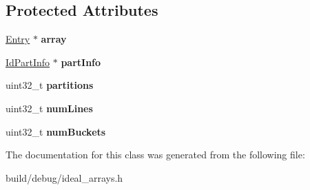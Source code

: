 \subsection*{Protected Attributes}
\begin{DoxyCompactItemize}
\item 
\hypertarget{classIdealLRUPartReplPolicy_abe479cb1f36a5b7028cc287696915b1f}{\hyperlink{structIdealLRUPartReplPolicy_1_1Entry}{Entry} $\ast$ {\bfseries array}}\label{classIdealLRUPartReplPolicy_abe479cb1f36a5b7028cc287696915b1f}

\item 
\hypertarget{classIdealLRUPartReplPolicy_a3903c466038d4348bc69637724e2bb18}{\hyperlink{structIdealLRUPartReplPolicy_1_1IdPartInfo}{Id\-Part\-Info} $\ast$ {\bfseries part\-Info}}\label{classIdealLRUPartReplPolicy_a3903c466038d4348bc69637724e2bb18}

\item 
\hypertarget{classIdealLRUPartReplPolicy_a9dfaf286a21c022139a36ed10d94e3bf}{uint32\-\_\-t {\bfseries partitions}}\label{classIdealLRUPartReplPolicy_a9dfaf286a21c022139a36ed10d94e3bf}

\item 
\hypertarget{classIdealLRUPartReplPolicy_aacf66826621b4e88242f767bafc98705}{uint32\-\_\-t {\bfseries num\-Lines}}\label{classIdealLRUPartReplPolicy_aacf66826621b4e88242f767bafc98705}

\item 
\hypertarget{classIdealLRUPartReplPolicy_aaca59e41a732517b26e87259f0fa589b}{uint32\-\_\-t {\bfseries num\-Buckets}}\label{classIdealLRUPartReplPolicy_aaca59e41a732517b26e87259f0fa589b}

\end{DoxyCompactItemize}


The documentation for this class was generated from the following file\-:\begin{DoxyCompactItemize}
\item 
build/debug/ideal\-\_\-arrays.\-h\end{DoxyCompactItemize}

